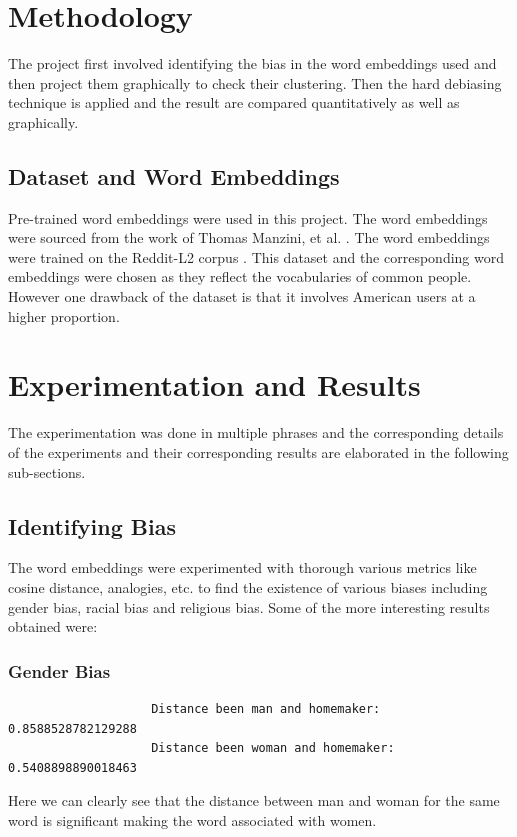 \documentclass[12pt, a4paper]{article}
\begin{document}
	\section{Methodology}
		The project first involved identifying the bias in the word embeddings used and then project them graphically to check their clustering. Then the hard debiasing technique is applied and the result are compared quantitatively as well as graphically. 
		
		\subsection{Dataset and Word Embeddings}
			Pre-trained word embeddings were used in this project. The word embeddings were sourced from the work of Thomas Manzini, et al. \cite{7,11}. The word embeddings were trained on the Reddit-L2 corpus \cite{12}. This dataset and the corresponding word embeddings were chosen as they reflect the vocabularies of common people. However one drawback of the dataset is that it involves American users at a higher proportion.
		
	\section{Experimentation and Results}
		The experimentation was done in multiple phrases and the corresponding details of the experiments and their corresponding results are elaborated in the following sub-sections.
		
		\subsection{Identifying Bias}
			The word embeddings were experimented with thorough various metrics like cosine distance, analogies, etc. to find the existence of various biases including gender bias, racial bias and religious bias. Some of the more interesting results obtained were:
			
			\subsubsection{Gender Bias}
				\begin{verbatim}
					Distance been man and homemaker: 	0.8588528782129288
					Distance been woman and homemaker: 0.5408898890018463
				\end{verbatim}
				Here we can clearly see that  the distance between man and woman for the same word is significant making the word associated with women.
				
\end{document}
